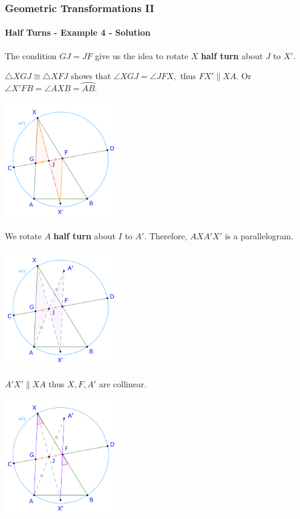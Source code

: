 \documentclass[8pt,xcolor=table,dvipsnames]{beamer}
\newcommand{\arc}[1]{\wideparen{#1}}
\begin{document}
\begin{frame}[t]
    \frametitle{Geometric Transformations II}
    \framesubtitle{Half Turns - Example 4 - Solution}
    \begin{overprint}
        The condition $GJ=JF$ give us the idea to rotate $X$ \textbf{half turn} about $J$ to $X'$.
        
        \bigbreak
        $\triangle XGJ \cong \triangle XFJ$ shows that $\angle XGJ = \angle JFX,$ thus $FX' \parallel XA.$
        Or $\angle X'FB = \angle AXB = \arc{AB}.$
        \begin{center}
            \includegraphics[width=5cm]{./svg/pdf/rotation-3b.pdf}
        \end{center}
        We rotate $A$ \textbf{half turn} about $I$ to $A'$.
        Therefore, $AXA'X'$ is a parallelogram.
        \begin{center}
            \includegraphics[width=5cm]{./svg/pdf/rotation-3c.pdf}
        \end{center}
        $A'X'\parallel XA$ thus $X, F, A'$ are collinear.
        \begin{center}
            \includegraphics[width=5cm]{./svg/pdf/rotation-3d.pdf}

\end{center}
\end{overprint}
\end{frame}
\end{document}
